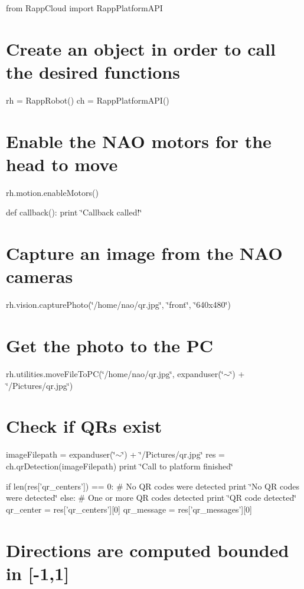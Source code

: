 from Rapp\-Cloud import Rapp\-Platform\-A\-P\-I

\section*{Create an object in order to call the desired functions}

rh = Rapp\-Robot() ch = Rapp\-Platform\-A\-P\-I()

\section*{Enable the N\-A\-O motors for the head to move}

rh.\-motion.\-enable\-Motors()

def callback()\-: print \char`\"{}\-Callback called!\char`\"{} \section*{Capture an image from the N\-A\-O cameras}

rh.\-vision.\-capture\-Photo(\char`\"{}/home/nao/qr.\-jpg\char`\"{}, \char`\"{}front\char`\"{}, \char`\"{}640x480\char`\"{}) \section*{Get the photo to the P\-C}

rh.\-utilities.\-move\-File\-To\-P\-C(\char`\"{}/home/nao/qr.\-jpg\char`\"{}, expanduser(\char`\"{}$\sim$\char`\"{}) + \char`\"{}/\-Pictures/qr.\-jpg\char`\"{}) \section*{Check if Q\-Rs exist}

image\-Filepath = expanduser(\char`\"{}$\sim$\char`\"{}) + \char`\"{}/\-Pictures/qr.\-jpg\char`\"{} res = ch.\-qr\-Detection(image\-Filepath) print \char`\"{}\-Call to platform finished\char`\"{}

if len(res\mbox{[}'qr\-\_\-centers'\mbox{]}) == 0\-: \# No Q\-R codes were detected print \char`\"{}\-No Q\-R codes were detected\char`\"{} else\-: \# One or more Q\-R codes detected print \char`\"{}\-Q\-R code detected\char`\"{} qr\-\_\-center = res\mbox{[}'qr\-\_\-centers'\mbox{]}\mbox{[}0\mbox{]} qr\-\_\-message = res\mbox{[}'qr\-\_\-messages'\mbox{]}\mbox{[}0\mbox{]}

\section*{Directions are computed bounded in \mbox{[}-\/1,1\mbox{]}}

